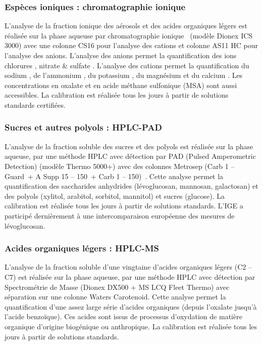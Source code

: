 \subsubsection{Espèces ioniques : chromatographie ionique}%
\label{ssub:espèces_ioniques_par_chromatographie}

L'analyse de la fraction ionique des aérosols et des acides organiques légers est réalisée
sur la phase aqueuse par chromatographie
ionique~\autocite{jaffrezoSeasonal2005,cenAmbient2017b} (modèle Dionex ICS 3000) avec une
colonne
CS16 pour l’analyse des cations et colonne AS11 HC pour l’analyse des anions. L’analyse
des anions permet la quantification des ions chlorures , nitrate  \&
sulfate . L’analyse des cations permet la quantification du sodium , de
l'ammonium , du potassium , du magnésium  et du calcium
. 
Les concentrations en oxalate et en acide méthane sulfonique (MSA) sont aussi accessibles.
La calibration est réalisée tous les jours à partir de solutions standards certifiées.

\subsubsection{Sucres et autres polyols : HPLC-PAD}%
\label{ssub:sucres_et_autres_polyols_hplc-pad}

L’analyse de la fraction soluble des sucres et des polyols est réalisée sur la phase
aqueuse, par une méthode HPLC avec détection par PAD (Pulsed Amperometric Detection)
(modèle Thermo 5000+) avec des colonnes Metrosep (Carb 1 – Guard + A Supp 15 – 150 + Carb
1 – 150)~\autocite{piotQuantification2012,wakedSource2014}.
Cette analyse permet la quantification des saccharides anhydrides (lévoglucosan,
mannosan, galactosan) et des polyols (xylitol, arabitol, sorbitol, mannitol) et sucres
(glucose). La calibration est réalisée tous les jours à partir de solutions standards.
L’IGE a participé dernièrement à une intercomparaison européenne des mesures de
lévoglucosan.

\subsubsection{Acides organiques légers : HPLC-MS}%
\label{ssub:acides_organiques_légers_hplc_ms}

L’analyse de la fraction soluble d’une vingtaine d’acides organiques légers (C2 – C7) est
réalisée sur la phase aqueuse, par une méthode HPLC avec détection par Spectrométrie de
Masse (Dionex DX500 + MS LCQ Fleet Thermo) avec séparation sur une colonne Waters
Carotenoid. Cette analyse permet la quantification d’une assez large série d'acides
organiques (depuis l’oxalate jusqu’à l’acide benzoïque). Ces acides sont issus de
processus d’oxydation de matière organique d’origine biogénique ou anthropique. La
calibration est réalisée tous les jours à partir de solutions standards.

